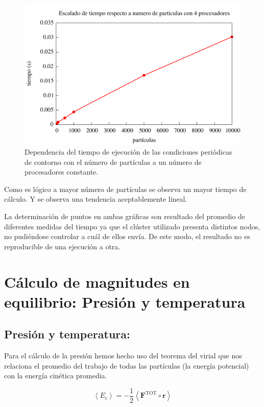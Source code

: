 \documentclass[onecolumn]{article}
\renewcommand{\vec}[1]{\mathbf{#1}}
\begin{document}
 \begin{figure}[h!]
	\includegraphics[scale=0.4]{lorena_particulas.pdf}
	\caption{Dependencia del tiempo de ejecución de las condiciones periódicas de contorno con el número de partículas a un número de procesadores constante.}
\end{figure}

Como es lógico a mayor número de partículas se observa un mayor tiempo de cálculo. Y se observa una tendencia aceptablemente lineal.

La determinación de puntos en ambas gráficas son resultado del promedio de diferentes medidas del tiempo ya que el clúster utilizado presenta distintos nodos, no pudiéndose controlar a cuál de ellos envía. De este modo, el resultado no es reproducible de una ejecución a otra.

\section{Cálculo de magnitudes en equilibrio: Presión y temperatura}

\subsection{Presión y temperatura:}
Para el cálculo de la presión hemos hecho uso del teorema del virial que nos relaciona el promedio del trabajo de todas las partículas (la energía potencial) con la energía cinética promedia.

\begin{equation}
\left\langle E_c \right\rangle= -\frac{1}{2} \left\langle \vec{F}^{\text{TOT}} \circ \vec{r} \right\rangle
\label{eq:virial}
\end{equation}
\end{document}
